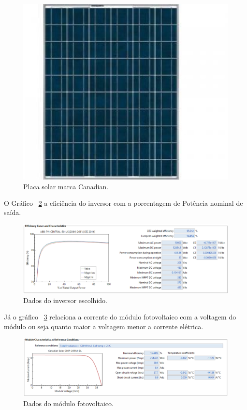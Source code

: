 \begin{figure}[!h]
  \centering
  \includegraphics[keepaspectratio=true,scale=0.8]{figuras/placa.eps}
  \caption{Placa solar marca Canadian.}
  \label{fig:placa}
\end{figure}

O Gráfico ~\ref{fig:smartgrid1} a eficiência do inversor com a porcentagem de Potência nominal de saída.

\begin{figure}[!h]
  \centering
  \includegraphics[keepaspectratio=true,scale=0.5]{figuras/smartgrid1.eps}
  \caption{Dados do inversor escolhido.}
  \label{fig:smartgrid1}
\end{figure}

Já o gráfico ~\ref{fig:smartgrid2} relaciona a corrente do módulo fotovoltaico com a voltagem do módulo ou seja quanto maior a voltagem menor a corrente elétrica.

\begin{figure}[!h]
  \centering
  \includegraphics[keepaspectratio=true,scale=0.4]{figuras/smartgrid2.eps}
  \caption{ Dados do módulo fotovoltaico.}
  \label{fig:smartgrid2}
\end{figure}

